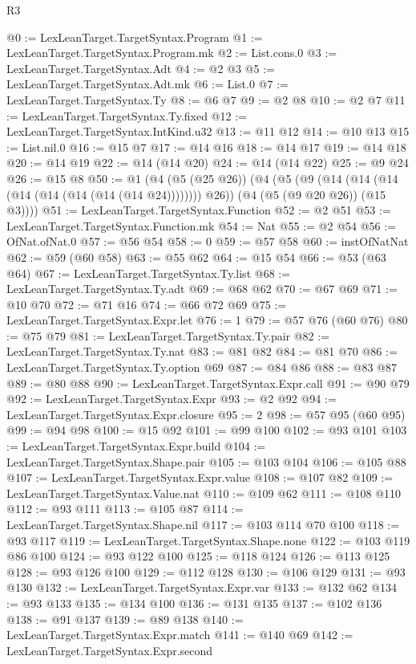\begin{lexlean}{R3}
\begin{coremodule}
@0 := LexLeanTarget.TargetSyntax.Program
@1 := LexLeanTarget.TargetSyntax.Program.mk
@2 := List.cons.{0}
@3 := LexLeanTarget.TargetSyntax.Adt
@4 := @2 @3
@5 := LexLeanTarget.TargetSyntax.Adt.mk
@6 := List.{0}
@7 := LexLeanTarget.TargetSyntax.Ty
@8 := @6 @7
@9 := @2 @8
@10 := @2 @7
@11 := LexLeanTarget.TargetSyntax.Ty.fixed
@12 := LexLeanTarget.TargetSyntax.IntKind.u32
@13 := @11 @12
@14 := @10 @13
@15 := List.nil.{0}
@16 := @15 @7
@17 := @14 @16
@18 := @14 @17
@19 := @14 @18
@20 := @14 @19
@22 := @14 (@14 @20)
@24 := @14 (@14 @22)
@25 := @9 @24
@26 := @15 @8
@50 := @1
    (@4
      (@5 (@25 @26))
      (@4
        (@5 (@9 (@14 (@14 (@14 (@14 (@14 (@14 (@14 (@14 @24)))))))) @26))
        (@4 (@5 (@9 @20 @26)) (@15 @3))))
@51 := LexLeanTarget.TargetSyntax.Function
@52 := @2 @51
@53 := LexLeanTarget.TargetSyntax.Function.mk
@54 := Nat
@55 := @2 @54
@56 := OfNat.ofNat.{0}
@57 := @56 @54
@58 := 0
@59 := @57 @58
@60 := instOfNatNat
@62 := @59 (@60 @58)
@63 := @55 @62
@64 := @15 @54
@66 := @53 (@63 @64)
@67 := LexLeanTarget.TargetSyntax.Ty.list
@68 := LexLeanTarget.TargetSyntax.Ty.adt
@69 := @68 @62
@70 := @67 @69
@71 := @10 @70
@72 := @71 @16
@74 := @66 @72 @69
@75 := LexLeanTarget.TargetSyntax.Expr.let
@76 := 1
@79 := @57 @76 (@60 @76)
@80 := @75 @79
@81 := LexLeanTarget.TargetSyntax.Ty.pair
@82 := LexLeanTarget.TargetSyntax.Ty.nat
@83 := @81 @82
@84 := @81 @70
@86 := LexLeanTarget.TargetSyntax.Ty.option @69
@87 := @84 @86
@88 := @83 @87
@89 := @80 @88
@90 := LexLeanTarget.TargetSyntax.Expr.call
@91 := @90 @79
@92 := LexLeanTarget.TargetSyntax.Expr
@93 := @2 @92
@94 := LexLeanTarget.TargetSyntax.Expr.closure
@95 := 2
@98 := @57 @95 (@60 @95)
@99 := @94 @98
@100 := @15 @92
@101 := @99 @100
@102 := @93 @101
@103 := LexLeanTarget.TargetSyntax.Expr.build
@104 := LexLeanTarget.TargetSyntax.Shape.pair
@105 := @103 @104
@106 := @105 @88
@107 := LexLeanTarget.TargetSyntax.Expr.value
@108 := @107 @82
@109 := LexLeanTarget.TargetSyntax.Value.nat
@110 := @109 @62
@111 := @108 @110
@112 := @93 @111
@113 := @105 @87
@114 := LexLeanTarget.TargetSyntax.Shape.nil
@117 := @103 @114 @70 @100
@118 := @93 @117
@119 := LexLeanTarget.TargetSyntax.Shape.none
@122 := @103 @119 @86 @100
@124 := @93 @122 @100
@125 := @118 @124
@126 := @113 @125
@128 := @93 @126 @100
@129 := @112 @128
@130 := @106 @129
@131 := @93 @130
@132 := LexLeanTarget.TargetSyntax.Expr.var
@133 := @132 @62
@134 := @93 @133
@135 := @134 @100
@136 := @131 @135
@137 := @102 @136
@138 := @91 @137
@139 := @89 @138
@140 := LexLeanTarget.TargetSyntax.Expr.match
@141 := @140 @69
@142 := LexLeanTarget.TargetSyntax.Expr.second

\end{coremodule}
\end{lexlean}
